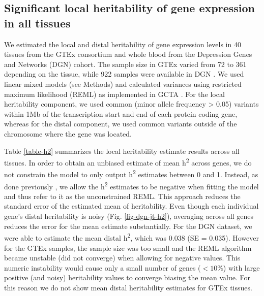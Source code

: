 \documentclass[10pt,letterpaper]{article}
\begin{document}
\subsection*{Significant local heritability of gene expression in all tissues}\label{local-genetic-variation-can-be-well-characterized-for-all-tissues}

We estimated the local and distal heritability of gene expression levels in 40 tissues from the GTEx consortium and whole blood from the Depression Genes and Networks (DGN) cohort. The sample size in GTEx varied from 72 to 361 depending on the tissue, while 922 samples were available in DGN \cite{Battle_2013}. We used linear mixed models (see Methods) and calculated variances using restricted maximum likelihood (REML) as implemented in GCTA \cite{Yang_2011}. For the local heritability component, we used common (minor allele frequency \textgreater{} 0.05) variants within 1Mb of the transcription start and end of each protein coding gene, whereas for the distal component, we used common variants outside of the chromosome where the gene was located.

Table \ref{table-h2} summarizes the local heritability estimate results across all tissues. In order to obtain an unbiased estimate of mean h\textsuperscript{2} across genes, we do not constrain the model to only output h\textsuperscript{2} estimates between 0 and 1. Instead, as done previously \cite{Price_2011,Wright_2014}, we allow the h\textsuperscript{2} estimates to be negative when fitting the model and thus refer to it as the unconstrained REML. This approach reduces the standard error of the estimated mean of heritability. Even though each individual gene's distal heritability is noisy (Fig. \ref{fig-dgn-jt-h2}), averaging across all genes reduces the error for the mean estimate substantially. For the DGN dataset, we were able to estimate the mean distal h\textsuperscript{2}, which was 0.038 (SE = 0.035). However for the GTEx samples, the sample size was too small and the REML algorithm became unstable (did not converge) when allowing for negative values. This numeric instability would cause only a small number of genes ($<10$\%) with large positive (and noisy) heritability values to converge biasing the mean value. For this reason we do not show mean distal heritability estimates for GTEx tissues. 
\end{document}

